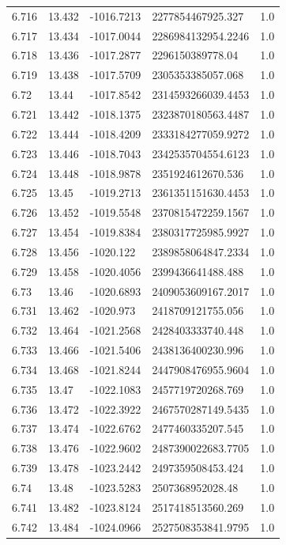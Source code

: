 \begin{tabular}{lllll}
6.716 & 13.432 & -1016.7213 & 2277854467925.327 & 1.0 \\
6.717 & 13.434 & -1017.0044 & 2286984132954.2246 & 1.0 \\
6.718 & 13.436 & -1017.2877 & 2296150389778.04 & 1.0 \\
6.719 & 13.438 & -1017.5709 & 2305353385057.068 & 1.0 \\
6.72 & 13.44 & -1017.8542 & 2314593266039.4453 & 1.0 \\
6.721 & 13.442 & -1018.1375 & 2323870180563.4487 & 1.0 \\
6.722 & 13.444 & -1018.4209 & 2333184277059.9272 & 1.0 \\
6.723 & 13.446 & -1018.7043 & 2342535704554.6123 & 1.0 \\
6.724 & 13.448 & -1018.9878 & 2351924612670.536 & 1.0 \\
6.725 & 13.45 & -1019.2713 & 2361351151630.4453 & 1.0 \\
6.726 & 13.452 & -1019.5548 & 2370815472259.1567 & 1.0 \\
6.727 & 13.454 & -1019.8384 & 2380317725985.9927 & 1.0 \\
6.728 & 13.456 & -1020.122 & 2389858064847.2334 & 1.0 \\
6.729 & 13.458 & -1020.4056 & 2399436641488.488 & 1.0 \\
6.73 & 13.46 & -1020.6893 & 2409053609167.2017 & 1.0 \\
6.731 & 13.462 & -1020.973 & 2418709121755.056 & 1.0 \\
6.732 & 13.464 & -1021.2568 & 2428403333740.448 & 1.0 \\
6.733 & 13.466 & -1021.5406 & 2438136400230.996 & 1.0 \\
6.734 & 13.468 & -1021.8244 & 2447908476955.9604 & 1.0 \\
6.735 & 13.47 & -1022.1083 & 2457719720268.769 & 1.0 \\
6.736 & 13.472 & -1022.3922 & 2467570287149.5435 & 1.0 \\
6.737 & 13.474 & -1022.6762 & 2477460335207.545 & 1.0 \\
6.738 & 13.476 & -1022.9602 & 2487390022683.7705 & 1.0 \\
6.739 & 13.478 & -1023.2442 & 2497359508453.424 & 1.0 \\
6.74 & 13.48 & -1023.5283 & 2507368952028.48 & 1.0 \\
6.741 & 13.482 & -1023.8124 & 2517418513560.269 & 1.0 \\
6.742 & 13.484 & -1024.0966 & 2527508353841.9795 & 1.0 \\

\end{tabular}
